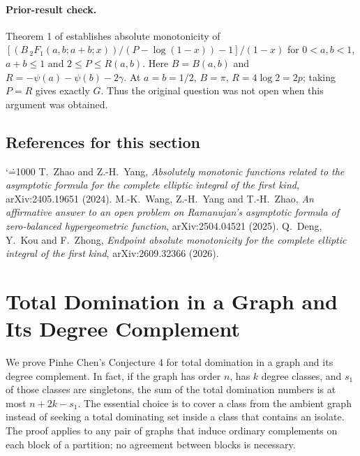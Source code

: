 \documentclass[11pt,a4paper]{article}
\makeatletter
\numberwithin{equation}{section}
\theoremstyle{definition}
\theoremstyle{remark}
\newenvironment{sectionabstract}{\par\smallskip\begingroup\small\noindent}{\par\endgroup\medskip}
\renewenvironment{thebibliography}[1]
 {\subsection*{References for this section}\small
  \list{\@biblabel{\@arabic\c@enumiv}}
       {\settowidth\labelwidth{\@biblabel{#1}}\leftmargin\labelwidth
        \advance\leftmargin\labelsep\@openbib@code
        \usecounter{enumiv}\let\p@enumiv\@empty
        \renewcommand\theenumiv{\@arabic\c@enumiv}}
  \sloppy\clubpenalty4000\widowpenalty4000\sfcode`\.=1000\relax}
 {\def\@noitemerr{\@latex@warning{Empty bibliography}}\endlist}
\makeatother
\begin{document}
\paragraph{Prior-result check.}
Theorem 1 of \cite{r30taisho:wyz} establishes absolute monotonicity of $[(B\,{}_2F_1(a,b;a+b;x))/(P-\log(1-x))-1]/(1-x)$ for $0<a,b<1$, $a+b\le1$ and $2\le P\le R(a,b)$. Here $B=B(a,b)$ and $R=-\psi(a)-\psi(b)-2\gamma$. At $a=b=1/2$, $B=\pi$, $R=4\log 2=2p$; taking $P=R$ gives exactly $G$. Thus the original question was not open when this argument was obtained.
\begin{thebibliography}{9}
 T.~Zhao and Z.-H.~Yang, \emph{Absolutely monotonic functions related to the asymptotic formula for the complete elliptic integral of the first kind}, arXiv:2405.19651 (2024).
 M.-K.~Wang, Z.-H.~Yang and T.-H.~Zhao, \emph{An affirmative answer to an open problem on Ramanujan's asymptotic formula of zero-balanced hypergeometric function}, arXiv:2504.04521 (2025).
 Q.~Deng, Y.~Kou and F.~Zhong, \emph{Endpoint absolute monotonicity for the complete elliptic integral of the first kind}, arXiv:2609.32366 (2026).
\end{thebibliography}

\par\endgroup

\begingroup
\newcommand{\gt}{\gamma_{\mathrm t}}
\section{\texorpdfstring{Total Domination in a Graph and Its Degree Complement}{Total Domination in a Graph and Its Degree Complement}}\label{section:r30showa}
\par\medskip


\begin{sectionabstract}
We prove Pinhe Chen's Conjecture 4 for total domination in a graph
and its degree complement. In fact, if the graph has order $n$, has
$k$ degree classes, and $s_1$ of those classes are singletons, the sum of
the total domination numbers is at most $n+2k-s_1$. The essential choice
is to cover a class from the ambient graph instead of seeking a total
dominating set inside a class that contains an isolate. The proof
applies to any pair of graphs that induce ordinary complements on each
block of a partition; no agreement between blocks is necessary.
\end{sectionabstract}
\end{document}
